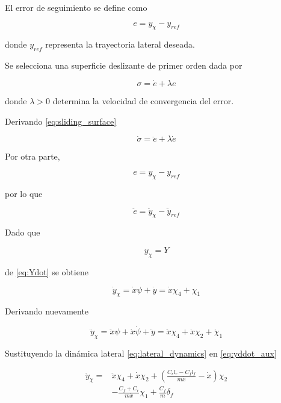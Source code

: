 \documentclass{article}
\begin{document}
El error de seguimiento se define como

\begin{equation}
e=y_\chi-y_{ref}
\end{equation}

donde $y_{ref}$ representa la trayectoria lateral deseada.

Se selecciona una superficie deslizante de primer orden dada por

\begin{equation}
\sigma=\dot e+\lambda e
\label{eq:sliding_surface}
\end{equation}

donde $\lambda>0$ determina la velocidad de convergencia del error.

Derivando \eqref{eq:sliding_surface}

\begin{equation}
\dot{\sigma}
=
\ddot e+\lambda \dot e
\label{eq:sigma_dot}
\end{equation}

Por otra parte,

\begin{equation}
e=y_\chi-y_{ref}
\end{equation}

por lo que

\begin{equation}
\ddot e
=
\ddot y_\chi-\ddot y_{ref}
\label{eq:error_ddot}
\end{equation}

Dado que

\begin{equation}
y_\chi=Y
\end{equation}

de \eqref{eq:Ydot} se obtiene

\begin{equation}
\dot y_\chi
=
\dot{x}\psi+\dot y
= \dot{x}\chi_4+\chi_1
\end{equation}

Derivando nuevamente

\begin{equation}
\ddot y_\chi
=
\ddot{x}\psi
+
\dot{x}\dot{\psi}
+
\ddot y
= \ddot{x}\chi_4 + \dot{x}\chi_2 + \dot{\chi}_1
\label{eq:yddot_aux}
\end{equation}

Sustituyendo la dinámica lateral \eqref{eq:lateral_dynamics} en \eqref{eq:yddot_aux}

\begin{equation}
\begin{aligned}
\ddot y_\chi
=&
\ddot{x}\chi_4
+
\dot{x}\chi_2
+
\left(
\frac{C_r l_r-C_f l_f}{m\dot{x}}
-\dot{x}
\right)\chi_2
\\
&
-\frac{C_f+C_r}{m\dot{x}}\chi_1
+
\frac{C_f}{m}\delta_f
\end{aligned}
\end{equation}
\end{document}
